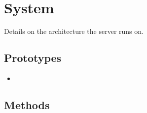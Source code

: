 \section{System}
Details on the architecture the \urbi server runs on.

\subsection{Prototypes}
\begin{itemize}
\item {}
\end{itemize}

\subsection{Methods}
\begin{itemize}

\end{itemize}
